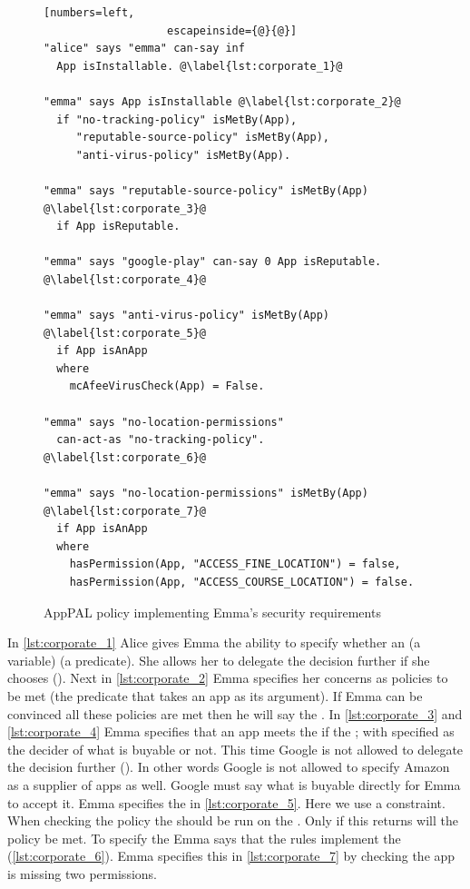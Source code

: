 \documentclass[twoside,letterpaper]{soups}
\begin{document}
\begin{figure}
\begin{lstlisting}[numbers=left,
                   escapeinside={@}{@}]
"alice" says "emma" can-say inf
  App isInstallable. @\label{lst:corporate_1}@

"emma" says App isInstallable @\label{lst:corporate_2}@
  if "no-tracking-policy" isMetBy(App),
     "reputable-source-policy" isMetBy(App),
     "anti-virus-policy" isMetBy(App).

"emma" says "reputable-source-policy" isMetBy(App) @\label{lst:corporate_3}@
  if App isReputable.

"emma" says "google-play" can-say 0 App isReputable. @\label{lst:corporate_4}@

"emma" says "anti-virus-policy" isMetBy(App) @\label{lst:corporate_5}@
  if App isAnApp
  where
    mcAfeeVirusCheck(App) = False.

"emma" says "no-location-permissions"
  can-act-as "no-tracking-policy". @\label{lst:corporate_6}@

"emma" says "no-location-permissions" isMetBy(App) @\label{lst:corporate_7}@
  if App isAnApp
  where
    hasPermission(App, "ACCESS_FINE_LOCATION") = false,
    hasPermission(App, "ACCESS_COURSE_LOCATION") = false.
\end{lstlisting}
\caption{AppPAL policy implementing Emma's security requirements}
\label{lst:corporate}
\end{figure}

In \autoref{lst:corporate_1} Alice gives Emma the ability to specify whether an  (a variable)  (a predicate).
She allows her to delegate the decision further if she chooses ().
Next in \autoref{lst:corporate_2} Emma specifies her concerns as policies to be met (the  predicate that takes an app as its argument).
If Emma can be convinced all these policies are met then he will say the .
In \autoref{lst:corporate_3} and \autoref{lst:corporate_4} Emma specifies that an app meets the  if the ;
  with  specified as the decider of what is buyable or not.
This time Google is not allowed to delegate the decision further ().
In other words Google is not allowed to specify Amazon as a supplier of apps as well.
Google must say what is buyable directly for Emma to accept it.
Emma specifies the  in \autoref{lst:corporate_5}.
Here we use a constraint.
When checking the policy the  should be run on the .
Only if this returns  will the policy be met.
To specify the  Emma says that the  rules implement the  (\autoref{lst:corporate_6}).
Emma specifies this in \autoref{lst:corporate_7} by checking the app is missing two permissions.
\end{document}
